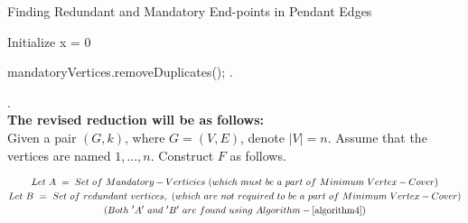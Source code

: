 \documentclass[11pt]{llncs}
\begin{document}


	\begin{algorithm}[H]
		\caption{Finding Redundant and Mandatory End-points in Pendant Edges}\label{algorithm4}

		\DontPrintSemicolon
		\SetAlgoLined

		\;
		
		Initialize x = 0\;
		\;
		
		\vspace{-3mm}

		mandatoryVertices.removeDuplicates();
		\;.
	\end{algorithm}

	.\\

	\noindent \textbf{The revised reduction will be as follows:} \cite{a4_pdf}\\
	Given a pair $(G, k)$, where $G = (V,E)$, denote $|V| = n$. Assume that the vertices are named $1, . . . , n$. Construct $F$ as follows.
	
	\vspace{-5mm}

	\begin{gather*}
		Let \,\, A \,\, =  \,\, Set \,\, of \,\, Mandatory-Verticies \,\,  (which \,\, must \,\, be\,\, a \,\, part \,\, of \,\, Minimum \,\, Vertex-Cover)\\
		Let \,\, B \,\, =  \,\, Set \,\, of \,\, redundant \,\, vertices, \,\,  (which \,\, are \,\, not \,\, required\,\, to \,\, be \,\, a \,\, part \,\, of \,\, Minimum \,\, Vertex-Cover)\\
		(Both \,\, 'A' \,\, and \,\, 'B' \,\, are \,\, found \,\, using \,\, Algorithm-\ref{algorithm4})
	\end{gather*}
\end{document}
